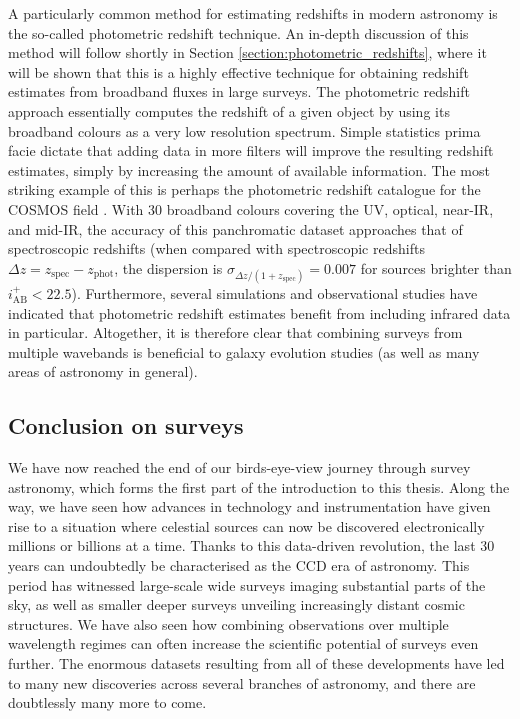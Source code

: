 A particularly common method for estimating redshifts in modern astronomy is the so-called photometric redshift technique. An in-depth discussion of this method will follow shortly in Section \ref{section:photometric_redshifts}, where it will be shown that this is a highly effective technique for obtaining redshift estimates from broadband fluxes in large surveys. The photometric redshift approach essentially computes the redshift of a given object by using its broadband colours as a very low resolution spectrum. Simple statistics prima facie dictate that adding data in more filters will improve the resulting redshift estimates, simply by increasing the amount of available information. The most striking example of this is perhaps the photometric redshift catalogue for the COSMOS field \citep{2009ApJ...690.1236I}. With 30 broadband colours covering the UV, optical, near-IR, and mid-IR, the accuracy of this panchromatic dataset approaches that of spectroscopic redshifts (when compared with spectroscopic redshifts $\Delta z= z_{\mathrm{spec}} - z_{\mathrm{phot}}$, the dispersion is $\sigma_{\Delta z/ (1+z_{\mathrm{spec}})} =0.007$ for sources brighter than $i^{+}_{\mathrm{AB}}<22.5$).  Furthermore, several simulations \citep{2008MNRAS.386.1219B,2008MNRAS.387..969A} and observational studies \citep{2009ApJ...690.1236I,2013MNRAS.428.1281J,2015MNRAS.446.2523B} have indicated that photometric redshift estimates benefit from including infrared data in particular.  Altogether, it is therefore clear that combining surveys from multiple wavebands is beneficial to galaxy evolution studies (as well as many areas of astronomy in general). \par 


\subsection{Conclusion on surveys}\label{subsection:conclusion_surveys_intro}
We have now reached the end of our birds-eye-view journey through survey astronomy, which forms the first part of the introduction to this thesis. Along the way, we have seen how advances in technology and instrumentation have given rise to a situation where celestial sources can now be discovered electronically millions or billions at a time. Thanks to this data-driven revolution, the last 30 years can undoubtedly be characterised as the CCD era of astronomy. This period has witnessed large-scale wide surveys imaging substantial parts of the sky, as well as smaller deeper surveys unveiling increasingly distant cosmic structures. We have also seen how combining observations over multiple wavelength regimes can often increase the scientific potential of surveys even further. The enormous datasets resulting from all of these developments have led to many new discoveries across several branches of astronomy, and there are doubtlessly many more to come. \par 

